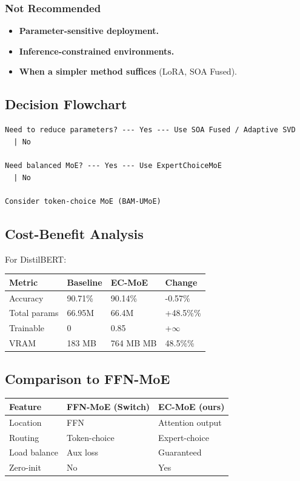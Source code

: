\subsubsection{Not Recommended}
\begin{itemize}
\item \textbf{Parameter-sensitive deployment.}
\item \textbf{Inference-constrained environments.}
\item \textbf{When a simpler method suffices} (LoRA, SOA Fused).

\end{itemize}
\subsection{Decision Flowchart}

\begin{lstlisting}
Need to reduce parameters? --- Yes --- Use SOA Fused / Adaptive SVD
  | No
   
Need balanced MoE? --- Yes --- Use ExpertChoiceMoE
  | No
   
Consider token-choice MoE (BAM-UMoE)
\end{lstlisting}

\subsection{Cost-Benefit Analysis}

For DistilBERT:

\begin{table}[H]
\centering
\small
\begin{tabular}{llll}
\toprule
\textbf{Metric} & \textbf{Baseline} & \textbf{EC-MoE} & \textbf{Change} \\
\midrule
Accuracy & 90.71\% & 90.14\% & -0.57\% \\
Total params & 66.95M & 66.4M & +48.5\%\% \\
Trainable & 0 & 0.85 & +$\infty$ \\
VRAM & 183 MB & 764 MB MB & 48.5\%\% \\
\bottomrule
\end{tabular}
\end{table}

\subsection{Comparison to FFN-MoE}

\begin{table}[H]
\centering
\small
\begin{tabular}{lll}
\toprule
\textbf{Feature} & \textbf{FFN-MoE (Switch)} & \textbf{EC-MoE (ours)} \\
\midrule
Location & FFN & Attention output \\
Routing & Token-choice & Expert-choice \\
Load balance & Aux loss & Guaranteed \\
Zero-init & No & Yes \\
\bottomrule
\end{tabular}
\end{table}

